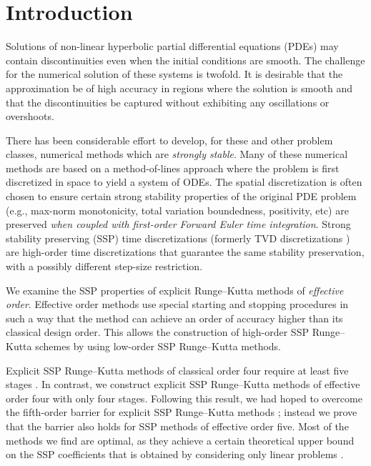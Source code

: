 \section{Introduction}\label{sec:Intro}
Solutions of non-linear hyperbolic partial differential equations (PDEs) may 
contain discontinuities even when the initial conditions are smooth.
The challenge for the numerical solution of these systems is twofold. 
It is desirable that the approximation be of high accuracy in regions where 
the solution is smooth and that the discontinuities be captured without 
exhibiting any oscillations or overshoots. 

There has been considerable effort to develop, for these and other
problem classes, numerical methods which are \emph{strongly stable}.
Many of these numerical methods are based on a method-of-lines approach 
where the problem is first discretized in space to yield a system of ODEs. 
The spatial discretization is often chosen to ensure certain strong stability 
properties of the original PDE problem (e.g., max-norm monotonicity, 
total variation boundedness, positivity, etc) are preserved
\emph{when coupled with first-order Forward Euler time integration}.
Strong stability preserving (SSP) time discretizations (formerly TVD
discretizations \cite{Gottlieb/Shu:1998}) are high-order time
discretizations that guarantee the same stability preservation, with a
possibly different step-size restriction.

We examine the SSP properties of explicit Runge--Kutta methods of 
\emph{effective order}. 
Effective order methods use special starting and stopping procedures
in such a way that the method can achieve an order of
accuracy higher than its classical design order.
This allows the construction of high-order SSP Runge--Kutta schemes by
using low-order SSP Runge--Kutta methods.

Explicit SSP Runge--Kutta methods of classical order four require at 
least five stages \cite{Gottlieb/Shu:1998}. 
In contrast, we construct explicit SSP Runge--Kutta methods
of effective order four with only four stages.
Following this result, we had hoped to overcome the fifth-order
barrier for explicit SSP Runge--Kutta methods \cite{Ruuth2002}; instead we
prove that the barrier also holds for SSP methods of effective
order five.
Most of the methods we find are optimal, as they achieve a certain theoretical
upper bound on the SSP coefficients that is obtained by considering only
linear problems \cite{Kraaijevanger1986}.

